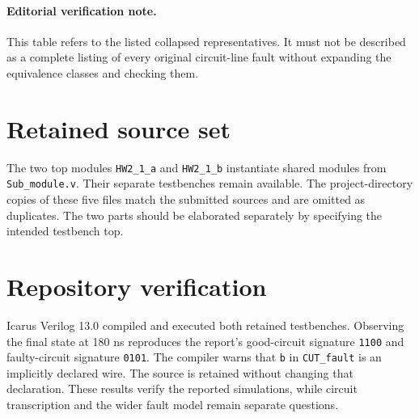 \documentclass[11pt,a4paper]{article}
\newcommand{\bits}[1]{\texttt{#1}}
\begin{document}
\paragraph{Editorial verification note.}
This table refers to the listed collapsed representatives. It must not be described as a complete listing of every original circuit-line fault without expanding the equivalence classes and checking them.

\section{Retained source set}
The two top modules \bits{HW2\_1\_a} and \bits{HW2\_1\_b} instantiate shared modules from \bits{Sub\_module.v}. Their separate testbenches remain available. The project-directory copies of these five files match the submitted sources and are omitted as duplicates. The two parts should be elaborated separately by specifying the intended testbench top.
\section{Repository verification}
Icarus Verilog 13.0 compiled and executed both retained testbenches. Observing the final state at 180 ns reproduces the report's good-circuit signature \bits{1100} and faulty-circuit signature \bits{0101}. The compiler warns that \bits{b} in \bits{CUT\_fault} is an implicitly declared wire. The source is retained without changing that declaration. These results verify the reported simulations, while circuit transcription and the wider fault model remain separate questions.
\end{document}
